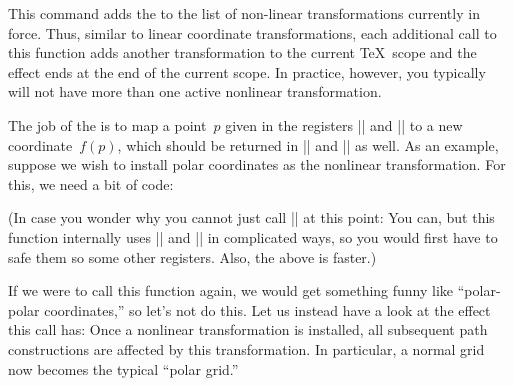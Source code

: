 \begin{command}{\pgftransformnonlinear{}}
  This command adds the  to the list of non-linear
  transformations currently in force. Thus, similar to linear
  coordinate transformations, each additional call to this function
  adds another transformation to the current \TeX\ scope and the
  effect ends at the end of the current scope. In practice, however,
  you typically will not have more than one active nonlinear
  transformation.

  The job of the  is to map a point~$p$
  given in the registers |\pgf@x| and |\pgf@y| to a new
  coordinate~$f(p)$, which should be returned in |\pgf@x| and |\pgf@y|
  as well. As an example, suppose we wish to install polar coordinates
  as the nonlinear transformation. For this, we need a bit of code:
\begin{codeexample}
\def\polartransformation{%
  \pgfmathsincos@{\pgf@sys@tonumber\pgf@x}%
  \pgf@x=\pgfmathresultx\pgf@y%
  \pgf@y=\pgfmathresulty\pgf@y%
}
\end{codeexample}
  (In case you wonder why you cannot just call |\pgfpointpolar| at
  this point: You can, but this function internally uses |\pgf@x|
  and |\pgf@y| in complicated ways, so you would first have to safe
  them so some other registers. Also, the above is faster.)

  If we were to call this function again, we would get something funny
  like ``polar-polar coordinates,'' so let's not do this. Let us
  instead have a look at the effect this call has: Once a nonlinear
  transformation is installed, all subsequent path constructions are
  affected by this transformation. In particular, a normal grid now
  becomes the typical ``polar grid.''

\begin{codeexample}[]
\end{codeexample}
\end{command}



